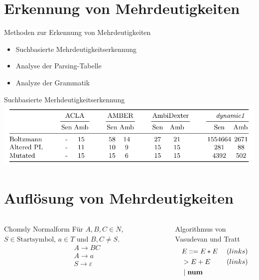 \documentclass[t]{beamer}
\renewcommand{\Coloneqq}{\mathrel{\mathop{::}}=}
\begin{document}
    \section{Erkennung von Mehrdeutigkeiten}\label{sec:erkennung-von-mehrdeutigkeiten}
    \begin{frame}
        \begin{block}{Methoden zur Erkennung von Mehrdeutigkeiten}
            \begin{itemize}
                \item Suchbasierte Mehrdeutigkeitserkennung
                \item Analyse der Parsing-Tabelle
                \item Analyze der Grammatik
            \end{itemize}
        \end{block}
        \begin{exampleblock}{Suchbasierte Merhdeutigkeitserkennung}
            \includegraphics[width=\textwidth]{./detectors}\cite{springer2013}
        \end{exampleblock}
    \end{frame}


    \section{Auflösung von Mehrdeutigkeiten}\label{sec:auflsung-von-mehrdeutigkeiten}
    \begin{frame}
        \begin{columns}[T]
            \begin{block}{Chomsly Normalform}
                Für $A,B,C \in N$, $S \in \text{Startsymbol}$, $a \in T$ und $B,C \neq S$. \\
                \begin{align*}
                    & A \rightarrow BC \\
                    & A \rightarrow a \\
                    & S \rightarrow \varepsilon
                \end{align*}
            \end{block}
            \begin{block}{Algorithmus von Vasudevan und Tratt}
                \begin{align*}
                    & E \Coloneqq E * E \phantom{|} & (links) \\
                    & > E + E & (links) \\
                    & \phantom{|} | \phantom{|} \bold{num}
                \end{align*}
            \end{block}
        \end{columns}
    \end{frame}
\end{document}
